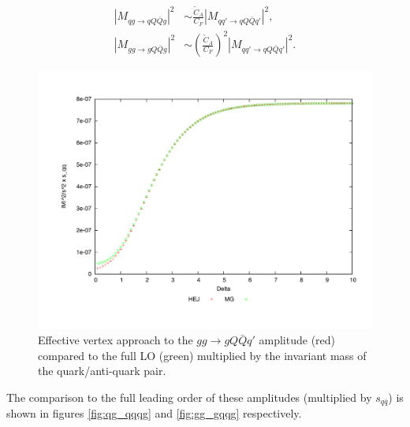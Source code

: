 \begin{equation}
\begin{split}
|M_{qg \to qQ\bar{Q}g}|^2 &\sim \frac{\tilde{C}_A}{C_F} |M_{qq' \to qQ\bar{Q}q'}|^2, \\
|M_{gg \to gQ\bar{Q}g}|^2 &\sim \left(\frac{\tilde{C}_A}{C_F}\right)^2 |M_{qq' \to qQ\bar{Q}q'}|^2.
\end{split}
\end{equation}

\begin{figure}[t]
\centering
\includegraphics[scale=0.45]{Images/gg_gQQx_sqqx_simplecf.pdf}
\caption{Effective vertex approach to the $gg \to gQ\bar{Q}q'$ amplitude (red) compared to the full LO (green) multiplied by the invariant mass of the quark/anti-quark pair.}
\label{fig:gg_qqq}
\end{figure}

The comparison to the full leading order of these amplitudes (multiplied by $s_{q\bar{q}}$) is shown in figures \ref{fig:qg_qqqg} and \ref{fig:gg_gqqg} respectively. 

